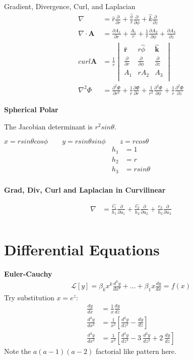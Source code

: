 \documentclass{article}
\begin{document}
\indent Gradient, Divergence, Curl, and Laplacian
\begin{align*}
    \nabla &= \hat{r} \frac{\partial}{\partial r} + \frac{\hat{\phi}}{r} \frac{\partial}{\partial \phi} + \hat{k} \frac{\partial}{\partial z} \\
    \nabla \cdot \mathbf{A} &= \frac{\partial A_1}{\partial r} + \frac{A_1}{r} + \frac{1}{r} \frac{\partial A_2}{\partial \phi} + \frac{\partial A_3}{\partial z} \\
    curl \mathbf{A} &=\frac{1}{r} \begin{vmatrix}
        \mathbf{\hat{r}} & r \hat{\phi} & \mathbf{\hat{k}} \\ 
        \frac{\partial}{\partial r} & \frac{\partial}{\partial \phi} & \frac{\partial}{\partial z} \\ 
        A_1 & rA_2 & A_3 \\ 
        \end{vmatrix} \\
    \nabla^2 \Phi &= \frac{\partial^2 \Phi}{\partial r^2} + \frac{1}{r} \frac{\partial \Phi}{\partial r} + \frac{1}{r^2} \frac{\partial^2 \Phi}{\partial \phi} + \frac{1}{r} \frac{\partial^2 \Phi}{\partial z}
\end{align*}

\textbf{Spherical Polar}  

The Jacobian determinant is $r^2 sin \theta$.  

$x = r sin \theta cos \phi \qquad y = rsin \theta sin \phi \qquad z=r cos\theta$  
\begin{align*}
h_1 &= 1 \\
h_2 &= r \\ 
h_3 &= rsin\theta \\
\end{align*}

\textbf{Grad, Div, Curl and Laplacian in Curvilinear}  

\begin{align*}
    \nabla &= \frac{\hat{e_1}}{h_1}  \frac{\partial}{\partial u_1} + \frac{\hat{e_2}}{h_2} \frac{\partial}{\partial u_2} + \frac{\hat{e_3}}{h_3}  \frac{\partial}{\partial u_3} \\
\end{align*}



\section{Differential Equations}

\textbf{Euler-Cauchy}
\begin{align*}
    \mathcal{L}[y] = \beta_{k}x^k \frac{d^ky}{dx^k} + \dots + \beta_{1} x \frac{dy}{dx} = f(x) 
\end{align*}
Try substitution $x=e^z$:
\begin{align*}
    \frac{dy}{dx} &= \frac{1}{x} \frac{dy}{dz} \\
    \frac{d^2y}{dx^2} &= \frac{1}{x^2} [\frac{d^2y}{dz^2}-\frac{dy}{dz}] \\
    \frac{d^3y}{dx^3} &= \frac{1}{x^3} [\frac{d^3y}{dz^3}-3 \ \frac{d^2y}{dz^2}+2 \ \frac{dy}{dz}]
\end{align*}
Note the $a(a-1)(a-2)$ factorial like pattern here.
\end{document}
